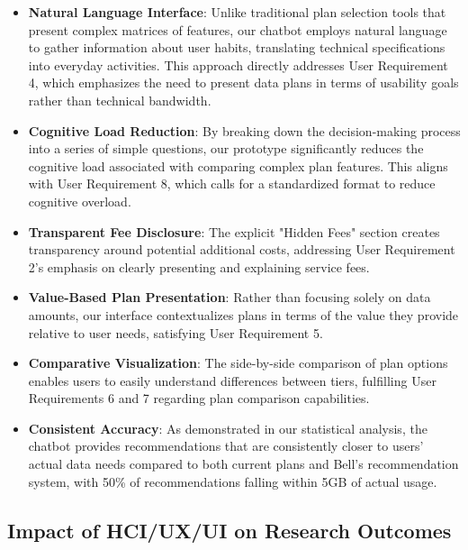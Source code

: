 \documentclass[conference]{IEEEtran}
\begin{document}
\begin{itemize}
    \item \textbf{Natural Language Interface}: Unlike traditional plan selection tools that present complex matrices of features, our chatbot employs natural language to gather information about user habits, translating technical specifications into everyday activities. This approach directly addresses User Requirement 4, which emphasizes the need to present data plans in terms of usability goals rather than technical bandwidth.
    
    \item \textbf{Cognitive Load Reduction}: By breaking down the decision-making process into a series of simple questions, our prototype significantly reduces the cognitive load associated with comparing complex plan features. This aligns with User Requirement 8, which calls for a standardized format to reduce cognitive overload.
    
    \item \textbf{Transparent Fee Disclosure}: The explicit "Hidden Fees" section creates transparency around potential additional costs, addressing User Requirement 2's emphasis on clearly presenting and explaining service fees.
    
    \item \textbf{Value-Based Plan Presentation}: Rather than focusing solely on data amounts, our interface contextualizes plans in terms of the value they provide relative to user needs, satisfying User Requirement 5.
    
    \item \textbf{Comparative Visualization}: The side-by-side comparison of plan options enables users to easily understand differences between tiers, fulfilling User Requirements 6 and 7 regarding plan comparison capabilities.
    
    \item \textbf{Consistent Accuracy}: As demonstrated in our statistical analysis, the chatbot provides recommendations that are consistently closer to users' actual data needs compared to both current plans and Bell's recommendation system, with 50\% of recommendations falling within 5GB of actual usage.
\end{itemize}

\subsection{Impact of HCI/UX/UI on Research Outcomes}
\end{document}
